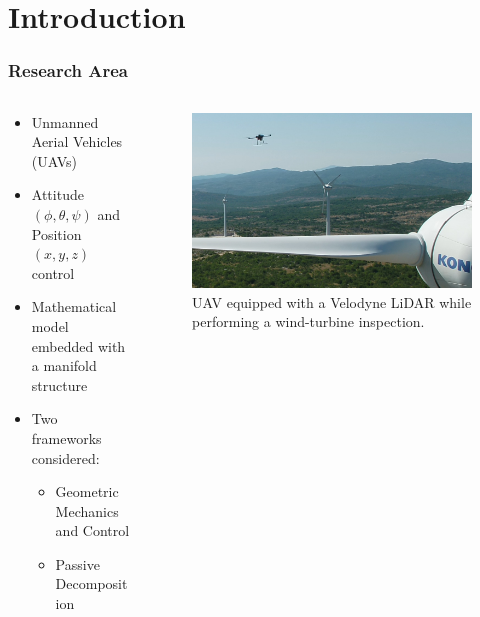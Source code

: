 
\section{Introduction}

\begin{frame}
	\frametitle{Research Area}
	\begin{columns}
		\begin{column}{0.4\textwidth}\centering
		\begin{itemize}
			\item Unmanned Aerial Vehicles (UAVs)
			\item Attitude $(\phi, \theta, \psi)$ and Position $(x, y, z)$ control
			\item Mathematical model embedded with a manifold structure
			\item Two frameworks considered:
			
			\begin{itemize}
				\item Geometric Mechanics and Control
				\item Passive Decomposition
			\end{itemize}
		\end{itemize}
		\end{column}
	
		\begin{column}{0.6\textwidth}\centering
			\begin{figure}[H]
				\includegraphics[width=0.9\columnwidth]{figures/drone_flight3_1.png}
				\caption{UAV equipped with a Velodyne LiDAR while performing a wind-turbine inspection.}
			\end{figure}
		\end{column}	
	\end{columns}
\end{frame}


